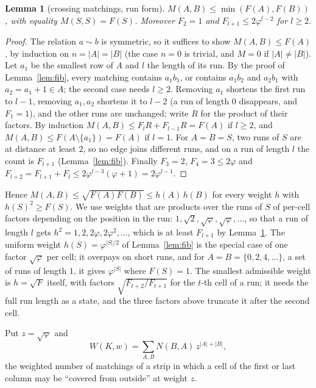 \documentclass[11pt]{amsart}
\newtheorem{lemma}[theorem]{Lemma}
\theoremstyle{definition}
\theoremstyle{remark}
\begin{document}
\begin{lemma}[crossing matchings, run form]\label{lem:runs}
$M(A, B) \le \min(F(A), F(B))$, with equality $M(S, S) = F(S)$. Moreover $F_2 = 1$ and
$F_{l+1} \le 2\varphi^{l-2}$ for $l \ge 2$.
\end{lemma}
\begin{proof}
The relation $a \sim b$ is symmetric, so it suffices to show $M(A, B) \le F(A)$, by induction on
$n = |A| = |B|$ (the case $n = 0$ is trivial, and $M = 0$ if $|A| \ne |B|$). Let $a_1$ be the
smallest row of $A$ and $l$ the length of its run. By the proof of Lemma~\ref{lem:fib}, every
matching contains $a_1 b_1$, or contains $a_1 b_2$ and $a_2 b_1$ with $a_2 = a_1 + 1 \in A$; the
second case needs $l \ge 2$. Removing $a_1$ shortens the first run to $l - 1$, removing $a_1, a_2$
shortens it to $l - 2$ (a run of length $0$ disappears, and $F_1 = 1$), and the other runs are
unchanged; write $R$ for the product of their factors. By induction
$M(A, B) \le F_l R + F_{l-1} R = F(A)$ if $l \ge 2$, and $M(A, B) \le F(A \setminus \{a_1\}) = F(A)$
if $l = 1$. For $A = B = S$, two runs of $S$ are at distance at least $2$, so no edge joins
different runs, and on a run of length $l$ the count is $F_{l+1}$ (Lemma~\ref{lem:fib}). Finally
$F_3 = 2$, $F_4 = 3 \le 2\varphi$ and $F_{l+2} = F_{l+1} + F_l \le 2\varphi^{l-3}(\varphi + 1) =
2\varphi^{l-1}$.
\end{proof}

Hence $M(A, B) \le \sqrt{F(A) F(B)} \le h(A)\, h(B)$ for every weight $h$ with $h(S)^2 \ge F(S)$.
We use weights that are products over the runs of $S$ of per-cell factors depending on the position
in the run: $1, \sqrt2, \sqrt\varphi, \sqrt\varphi, \dots$, so that a run of length $l$ gets
$h^2 = 1, 2, 2\varphi, 2\varphi^2, \dots$, which is at least $F_{l+1}$ by Lemma~\ref{lem:runs}. The
uniform weight $h(S) = \varphi^{|S|/2}$ of Lemma~\ref{lem:fib} is the special case of one factor
$\sqrt\varphi$ per cell; it overpays on short runs, and for $A = B = \{0, 2, 4, \dots\}$, a set of
runs of length $1$, it gives $\varphi^{|S|}$ where $F(S) = 1$. The smallest admissible weight is
$h = \sqrt F$ itself, with factors $\sqrt{F_{t+2}/F_{t+1}}$ for the $t$-th cell of a run; it needs
the full run length as a state, and the three factors above truncate it after the second cell.

Put $z = \sqrt\varphi$ and
\[
  W(K, w) = \sum_{A, B} N(B, A)\, z^{|A| + |B|},
\]
the weighted number of matchings of a strip in which a cell of the first or last column may be
``covered from outside'' at weight $z$.
\end{document}
